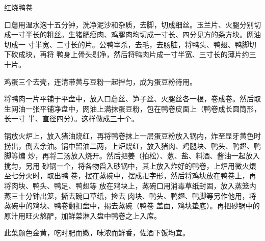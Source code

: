 \begin{recipe}{红烧鸭卷}

\ingredients


\preparation

\step 口蘑用温水泡十五分钟，洗净泥沙和杂质，去脚，切成细丝。玉兰片、火腿分别切
成一寸半长的粗丝。生猪肥瘦肉、鸡腿肉均切成一寸长、四分见方的条方块。网油切成一
寸半宽、二寸长的片。公鸭宰杀，去毛，去肠脏，将鸭头、鸭翅、鸭脚切下砍成块，再将
鸭身上骨头剔净，然后将鸭肉片成一寸半宽、三寸长的薄片约三十片。

\step 鸡蛋三个去壳，连清带黄与豆粉一起拌匀，成为蛋豆粉待用。

\step 将鸭肉一片平铺于平盘中，放入口蘑丝、笋子丝、火腿丝各一根，卷成卷。然后取
生网油一张平铺净盘中，网油上满抹蛋豆粉，包在鸭卷皮面上（鸭卷成长圆筒形，长一寸
半、直径四分）。这样做成三十个。

\step 锅放火炉上，放入猪油烧红，再将鸭卷抹上一层蛋豆粉放入锅内，炸至显牙黄色时
捞出，倒去余油。锅中留油二两，上炉烧红，放入猪肉、鸡腿块、鸭头、鸭翅、鸭脚等煸
炒，再将二汤放入烧开。然后把姜（拍松）、葱、盐、料酒、酱油一起放入搅匀，另用
砂锅一个，将各物舀入砂锅中，其上放入炸好的鸭卷，上炉用微火煨至七分火时，取出鸭
卷，摆在蒸碗中，摆成卍字形，然后将鸡块放在鸭卷上，再将肉块、鸭头、鸭足、鸭翅等
放在鸡块上，蒸碗口用消毒草纸封固，放入蒸笼内蒸三十分钟出笼，撕去碗口草纸，捡去
肉块、鸭头、鸭翅、鸭脚等另作他用，将蒸碗中的鸡块、鸭卷翻扣盘中，揭去蒸碗（鸭卷
盖面，鸡块垫底）。再把砂锅中的原汁用旺火熬酽，加鲜菜淋入盘中鸭卷之上入席。

\features

此菜颜色金黄，吃时肥而嫩，味浓而鲜香，佐酒下饭均宜。

\end{recipe}

